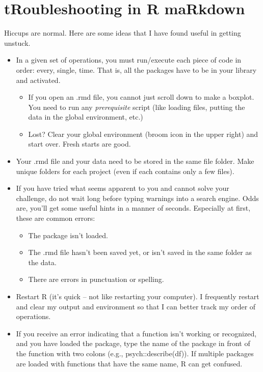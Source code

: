 \documentclass[
  11pt,
]{book}
\providecommand{\tightlist}{%
  \setlength{\itemsep}{0pt}\setlength{\parskip}{0pt}}
\begin{document}
\hypertarget{troubleshooting-in-r-markdown}{%
\section{tRoubleshooting in R maRkdown}\label{troubleshooting-in-r-markdown}}

Hiccups are normal. Here are some ideas that I have found useful in getting unstuck.

\begin{itemize}
\tightlist
\item
  In a given set of operations, you must run/execute each piece of code in order: every, single, time. That is, all the packages have to be in your library and activated.

  \begin{itemize}
  \tightlist
  \item
    If you open an .rmd file, you cannot just scroll down to make a boxplot. You need to run any \emph{prerequisite} script (like loading files, putting the data in the global environment, etc.)
  \item
    Lost? Clear your global environment (broom icon in the upper right) and start over. Fresh starts are good.
  \end{itemize}
\item
  Your .rmd file and your data need to be stored in the same file folder. Make unique folders for each project (even if each contains only a few files).
\item
  If you have tried what seems apparent to you and cannot solve your challenge, do not wait long before typing warnings into a search engine. Odds are, you'll get some useful hints in a manner of seconds. Especially at first, these are common errors:

  \begin{itemize}
  \tightlist
  \item
    The package isn't loaded.
  \item
    The .rmd file hasn't been saved yet, or isn't saved in the same folder as the data.
  \item
    There are errors in punctuation or spelling.
  \end{itemize}
\item
  Restart R (it's quick -- not like restarting your computer). I frequently restart and clear my output and environment so that I can better track my order of operations.
\item
  If you receive an error indicating that a function isn't working or recognized, and you have loaded the package, type the name of the package in front of the function with two colons (e.g., psych::describe(df)). If multiple packages are loaded with functions that have the same name, R can get confused.
\end{itemize}
\end{document}
